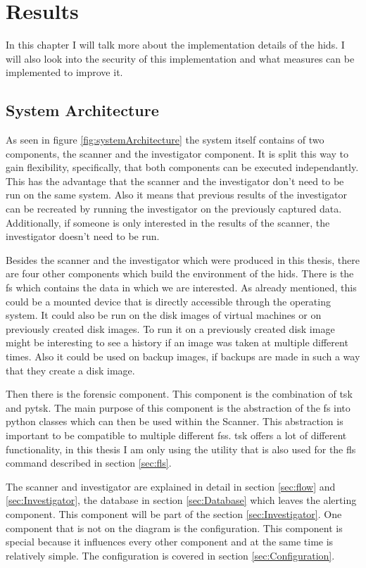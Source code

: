 
\chapter{Results}

In this chapter I will talk more about the implementation details of the \gls{hids}. I will also look into the security of this implementation and what measures can be implemented to improve it. 

\section{System Architecture}
\label{sec:Architecture}

As seen in figure \ref{fig:systemArchitecture} the system itself contains of two components, the scanner and the investigator component. It is split this way to gain flexibility, specifically, that both components can be executed independantly. This has the advantage that the scanner and the investigator don't need to be run on the same system. Also it means that previous results of the investigator can be recreated by running the investigator on the previously captured data. Additionally, if someone is only interested in the results of the scanner, the investigator doesn't need to be run.

Besides the scanner and the investigator which were produced in this thesis, there are four other components which build the environment of the \gls{hids}. There is the \gls{fs} which contains the data in which we are interested. As already mentioned, this could be a mounted device that is directly accessible through the operating system. It could also be run on the disk images of virtual machines or on previously created disk images. To run it on a previously created disk image might be interesting to see a history if an image was taken at multiple different times. Also it could be used on backup images, if backups are made in such a way that they create a disk image. 

Then there is the forensic component. This component is the combination of \gls{tsk} and \gls{pytsk}. The main purpose of this component is the abstraction of the \gls{fs} into python classes which can then be used within the Scanner. This abstraction is important to be compatible to multiple different \glspl{fs}. \gls{tsk} offers a lot of different functionality, in this thesis I am only using the utility that is also used for the fls command described in section \ref{sec:fls}. 

The scanner and investigator are explained in detail in section \ref{sec:flow} and \ref{sec:Investigator}, the database in section \ref{sec:Database} which leaves the alerting component. This component will be part of the section \ref{sec:Investigator}. One component that is not on the diagram is the configuration. This component is special because it influences every other component and at the same time is relatively simple. The configuration is covered in section \ref{sec:Configuration}.

